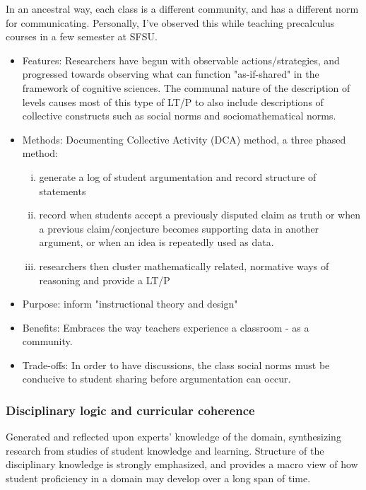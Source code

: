 \documentclass{TC}
\begin{document}
 \begin{remark}
  In an ancestral way, each class is a different community, and has a different norm for communicating. Personally, I've observed this while teaching precalculus courses in a few semester at SFSU.
 \end{remark}
\begin{multicols}{2}
\begin{itemize}
\item Features: Researchers have begun with observable actions/strategies, and progressed towards observing what can function "as-if-shared" in the framework of cognitive sciences. The communal nature of the description of levels  causes most of this type of LT/P to also include descriptions of collective constructs such as social norms and sociomathematical norms.
\item Methods: Documenting Collective Activity (DCA) method, a three phased method:
\begin{enumerate}[(i)]
\item generate a log of student argumentation and record structure of statements
\item record when students accept a previously disputed claim as truth or when a previous claim/conjecture becomes supporting data in another argument, or when an idea is repeatedly used as data.
\item researchers then cluster mathematically related, normative ways of reasoning and provide a LT/P
\end{enumerate}

\item Purpose: inform "instructional theory and design" 
\item Benefits: Embraces the way teachers experience a classroom - as a community.
\item Trade-offs: In order to have discussions, the class social norms must be conducive to student sharing before argumentation can occur.
 \end{itemize}
 \end{multicols}
 
 
\subsubsection{Disciplinary logic and curricular coherence}\label{disciplinary_logic}

 Generated and reflected upon experts' knowledge of the domain, synthesizing research from studies of student knowledge and learning. Structure of the disciplinary knowledge is strongly emphasized, and provides a macro view of how student proficiency in a domain may develop over a long span of time. 
 
\end{document}
